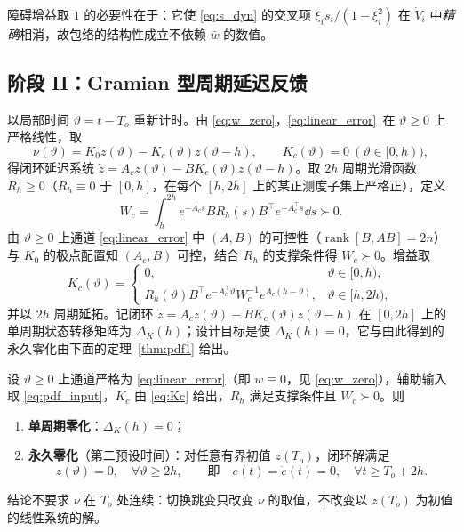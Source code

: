 障碍增益取 \(1\) 的必要性在于：它使 \eqref{eq:s_dyn} 的交叉项 \(\xi_is_i/(1-\xi_i^2)\) 在 \(\dot V_i\) 中\emph{精确}相消，故包络的结构性成立不依赖 \(\bar w\) 的数值。

\subsection{阶段 II：Gramian 型周期延迟反馈}
\label{sec:pdf}

以局部时间 \(\vartheta=t-T_o\) 重新计时。由 \eqref{eq:w_zero}，\eqref{eq:linear_error}~在 \(\vartheta\ge0\) 上严格线性，取
\begin{equation}
\nu(\vartheta)=K_0z(\vartheta)-K_c(\vartheta)z(\vartheta-h),\qquad
K_c(\vartheta)=0\ (\vartheta\in[0,h)),
\label{eq:pdf_input}
\end{equation}
得闭环延迟系统 \(\dot z=A_cz(\vartheta)-BK_c(\vartheta)z(\vartheta-h)\)。取 \(2h\) 周期光滑函数 \(R_h\ge0\)（\(R_h\equiv0\) 于 \([0,h]\)，在每个 \([h,2h]\) 上的某正测度子集上严格正），定义
\begin{equation}
W_c=\int_h^{2h}e^{-A_cs}BR_h(s)B^{\top}e^{-A_c^{\top}s}\dd s\succ0 .
\label{eq:Wc}
\end{equation}
由 \(\vartheta\ge0\) 上通道 \eqref{eq:linear_error} 中 \((A,B)\) 的可控性（\(\operatorname{rank}[B,AB]=2n\)）与 \(K_0\) 的极点配置知 \((A_c,B)\) 可控，结合 \(R_h\) 的支撑条件得 \(W_c\succ0\)。增益取
\begin{equation}
K_c(\vartheta)=
\begin{cases}
0, & \vartheta\in[0,h),\\[2pt]
R_h(\vartheta)B^{\top}e^{-A_c^{\top}\vartheta}W_c^{-1}e^{A_c(h-\vartheta)}, & \vartheta\in[h,2h),
\end{cases}
\label{eq:Kc}
\end{equation}
并以 \(2h\) 周期延拓。记闭环 \(\dot z=A_cz(\vartheta)-BK_c(\vartheta)z(\vartheta-h)\) 在 \([0,2h]\) 上的单周期状态转移矩阵为 \(\Delta_K(h)\)；设计目标是使 \(\Delta_K(h)=0\)，它与由此得到的永久零化由下面的定理~\ref{thm:pdf1} 给出。

\begin{theorem}\label{thm:pdf1}\label{thm:pdf}
设 \(\vartheta\ge0\) 上通道严格为 \eqref{eq:linear_error}（即 \(w\equiv0\)，见 \eqref{eq:w_zero}），辅助输入取 \eqref{eq:pdf_input}，\(K_c\) 由 \eqref{eq:Kc} 给出，\(R_h\) 满足支撑条件且 \(W_c\succ0\)。则
\begin{enumerate}
  \item[\textup{(1)}] \textbf{单周期零化}：\(\Delta_K(h)=0\)；
  \item[\textup{(2)}] \textbf{永久零化}（第二预设时间）：对任意有界初值 \(z(T_o)\)，闭环解满足
\[
z(\vartheta)=0,\quad\forall\vartheta\ge2h,
\qquad\text{即}\quad e(t)=\dot e(t)=0,\quad\forall t\ge T_o+2h .
\]
\end{enumerate}
结论不要求 \(\nu\) 在 \(T_o\) 处连续：切换跳变只改变 \(\nu\) 的取值，不改变以 \(z(T_o)\) 为初值的线性系统的解。
\end{theorem}

